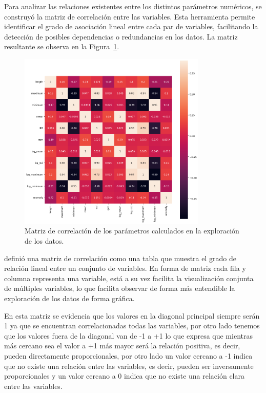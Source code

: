\documentclass[11pt,a4paper,spanish]{book}
\numberwithin{equation}{chapter}
\numberwithin{figure}{chapter}
\begin{document}
Para analizar las relaciones existentes entre los distintos parámetros numéricos, se 
construyó la matriz de correlación entre las variables. Esta herramienta permite 
identificar el grado de asociación lineal entre cada par de variables, facilitando la 
detección de posibles dependencias o redundancias en los datos. La matriz resultante se 
observa en la Figura~\ref{fig:figCorrMat}. 


\begin{figure}[h]
    \centering
    \includegraphics[width=0.8\textwidth]{media/dataset/corr-mat.png}
    \caption{Matriz de correlación de los parámetros calculados en la exploración de los datos. }
    \label{fig:figCorrMat}
\end{figure}


\cite{Alvarez2023} definió una matriz de correlación como una tabla que muestra el grado 
de relación lineal entre un conjunto de variables. En forma de matriz cada fila y 
columna representa una variable, está a su vez facilita la visualización conjunta de 
múltiples variables, lo que facilita observar de forma más entendible la exploración de 
los datos de forma gráfica.


En esta matriz se evidencia que los valores en la diagonal principal siempre serán 1 ya 
que se encuentran correlacionadas todas las variables, por otro lado tenemos que los 
valores fuera de la diagonal van de -1 a +1 lo que expresa que mientras más cercano sea 
el valor a +1 más mayor será la relación positiva, es decir, pueden directamente 
proporcionales, por otro lado un valor cercano a -1 indica que no existe una relación 
entre las variables, es decir, pueden ser inversamente proporcionales y un valor cercano 
a 0 indica que no existe una relación clara entre las variables. \cite{Alvarez2023}
\end{document}
